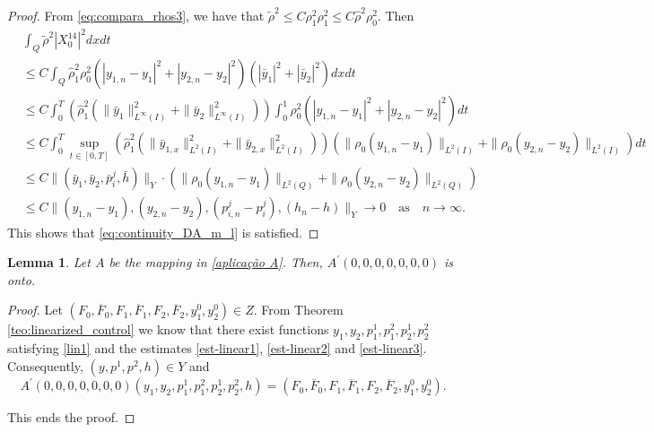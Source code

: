 \documentclass[11pt,a4paper]{amsart}
\numberwithin{equation}{section}
\newtheorem{lemma}{Lemma}[section]
\begin{document}
\begin{proof}
    \noindent From  \eqref{eq:compara_rhos3}, we have  that  $\tilde\rho^2\leq C \rho_1^2 \rho^2_1\leq C \hat{\rho}^2 \rho_0^2 $. Then
    \begin{equation*}
    \begin{split}
    	&\int_{Q} \tilde\rho^{2}|X_{0}^{14}|^{2} dxdt\\
        &\leq C \int_{Q} \hat{\rho}_1^2 \rho_0^2  ( |y_{1,n}-y_1|^2 + |y_{2,n}-y_2|^2 ) (|\bar y_1|^{2} + |\bar y_2|^{2} )dxdt\\
    	&\leq C \int_0^T \left(\hat{\rho}_1^2 (\| \bar{y}_1\|^2_{L^\infty(I)} + \| \bar{y}_2\|^2_{L^\infty(I)})\right)\int_{0}^{1} \rho_0^2  (|y_{1,n}-y_1|^2 + |y_{2,n}-y_2|^2 ) dt\\
        &\leq C \int_0^T \sup_{t\in [0,T]}\left(\hat{\rho}_1^2 (\| \bar{y}_{1,x}\|^2_{L^2(I)} + \| \bar{y}_{2,x}\|^2_{L^2(I)})\right) \left( \|\rho_0 (y_{1,n}-y_1)\|_{L^2(I)} + \|\rho_0 (y_{2,n}-y_2)\|_{L^2(I)} \right) dt\\
    	&\leq C\|(\bar y_1,\bar y_2,\bar p_i^j,\bar h)\|_{{Y}} \cdot \left( \|\rho_0 (y_{1,n}-y_1)\|_{L^2(Q)} + \|\rho_0 (y_{2,n}-y_2)\|_{L^2(Q)} \right)\\
    	&\leq C\|(y_{1,n}-y_1),(y_{2,n}-y_2),(p^{j}_{i,n}-p^{j}_i),(h_{n}-h)\|_{{Y}}\rightarrow 0 \quad\text{as}\quad n \to \infty.
    \end{split}
    \end{equation*}
    This shows that \eqref{eq:continuity_DA_m_l} is satisfied. 
\end{proof}


 \begin{lemma}\label{lema3}
 Let $A$ be the mapping in \eqref{aplicação A}. Then, $A^{\prime}(0,0,0,0,0,0,0)$ is onto.
 \end{lemma}
\begin{proof}
    Let $(F_0, \overline{F}_0,F_1, \overline{F}_1,F_2, \overline{F}_2,y^{0}_1, y^{0}_2)\in {Z}$. From Theorem \ref{teo:linearized_control} we know that there exist functions $y_1,y_2,p^{1}_1,p^{2}_1,p^{1}_2,p^{2}_2$ satisfying \eqref{lin1} and the estimates \eqref{est-linear1}, \eqref{est-linear2} and \eqref{est-linear3}. 
    Consequently, $(y,p^{1},p^{2},h)\in {Y}$ and $$A^{\prime}(0,0,0,0,0,0,0)(y_1,y_2,p^{1}_1,p^{2}_1,p^{1}_2,p^{2}_2,h)=(F_0, \overline{F}_0,F_1, \overline{F}_1,F_2, \overline{F}_2,y^{0}_1,y^0_2).$$ 
    \hfill

    This ends the proof.
\end{proof}
\end{document}
